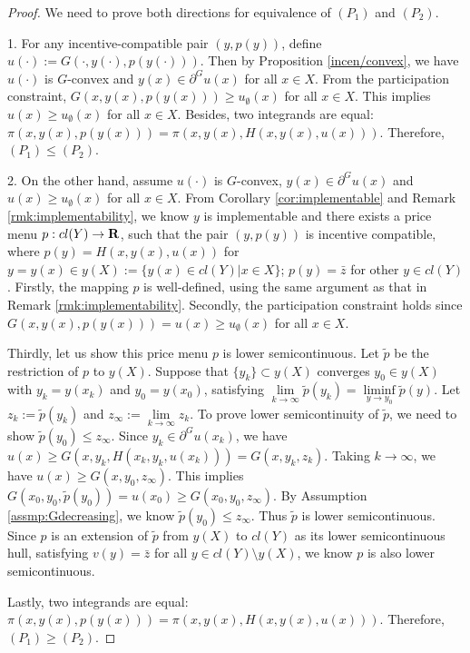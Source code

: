 \begin{proof} %
	
	We need to prove both directions for equivalence of $(P_1)$ and $(P_2)$.
	
	1. For any incentive-compatible pair $(y, p(y))$, define $u(\cdot) := G(\cdot,y(\cdot), p(y(\cdot)))$. Then by Proposition \ref{incen/convex}, we have $u(\cdot)$ is $G$-convex and $y(x) \in \partial^G u(x)$ for all $x \in X$. From the participation constraint, $G(x, y(x), p(y(x))) \ge u_{\emptyset}(x)$ for all $x\in X$. This implies $u(x)\ge u_{\emptyset}(x)$ for all $x\in X$. Besides, two integrands are equal: $\pi(x, y(x), p(y(x))) = \pi(x,y(x), H(x,y(x), u(x)))$. Therefore, $(P_1) \le (P_2)$.
	
	2. On the other hand, assume $u(\cdot)$ is $G$-convex, $y(x)\in \partial^G u(x)$ and $u(x) \ge u_{\emptyset}(x)$ for all $x \in X$. From Corollary \ref{cor:implementable} and Remark \ref{rmk:implementability}, we know $y$ is implementable and there exists a price menu $p: cl(Y) \rightarrow {\mathbf R}$, such that the pair $(y, p(y))$ is incentive compatible, where $p(y) = H(x,y(x), u(x))$ for $y = y(x) \in y(X) :=\{ y(x) \in cl(Y) | x \in X \}$; $p(y) = \bar{z}$ for other $y\in cl(Y)$. Firstly, the mapping $p$ is well-defined, using the same argument as that in Remark \ref{rmk:implementability}. %
	Secondly, the participation constraint holds since $G(x,y(x), p(y(x))) = u(x) \ge u_{\emptyset}(x)$ for all $x\in X$. 
	
	Thirdly, let us show this price menu $p$ is lower semicontinuous. Let $\tilde{p}$ be the restriction of $p$ to $y(X)$. Suppose that $\{y_k \} \subset y(X)$ converges $y_0 \in y(X)$ with $y_k = y(x_k)$ and $y_0 = y(x_0)$, satisfying $\lim\limits_{k \rightarrow \infty} \tilde{p}(y_k) = \liminf\limits_{y \rightarrow y_{0}} \tilde{p}(y)$.  Let $z_{k}:= \tilde{p}(y_k)$ and $z_{\infty}:=\lim\limits_{k \rightarrow \infty} z_k$. To prove lower semicontinuity of $\tilde{p}$, we need to show $\tilde{p}(y_0)\le z_{\infty}$.  Since $y_k \in \partial^G u(x_k)$, we have $u(x) \ge G(x,y_k, H(x_k, y_k, u(x_k))) = G(x, y_k, z_k)$. Taking $k\rightarrow \infty$, we have $u(x)\ge G(x, y_0, z_{\infty})$. This implies $G(x_0, y_0, \tilde{p}(y_0)) = u(x_0) \ge G(x_0, y_0, z_{\infty})$. By Assumption \ref{assmp:Gdecreasing}, we know $\tilde{p}(y_0) \le z_{\infty}$. Thus $\tilde{p}$ is lower semicontinuous. Since $p$ is an extension of $\tilde{p}$ from $y(X)$ to $cl(Y)$ as its lower semicontinuous hull, satisfying $v(y)= \bar{z}$ for all $y\in cl(Y)\setminus y(X)$, we know $p$ is also lower semicontinuous.
	
	Lastly, two integrands are equal: $\pi(x, y(x), p(y(x))) = \pi(x,y(x), H(x,y(x), u(x)))$. Therefore, $(P_1) \ge (P_2)$.
\end{proof}


